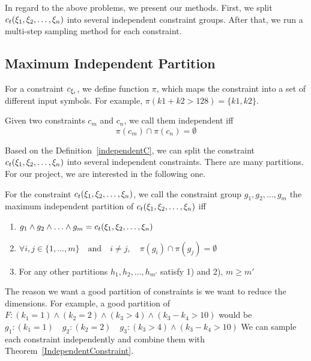 In regard to the above problems, we present our methods. First, we split
$c_t({\xi}_{1},{\xi}_{2},\ldots,{\xi}_{n})$ into several independent constraint
groups. After that, we run a multi-step sampling method for each constraint.

\subsection{Maximum Independent Partition}

For a constraint $c_{{\xi}_{i}}$, we define function $\pi$, which maps the
constraint into a set of different input symbols. For example, $\pi(k1 + k2 >
    128) = \{k1, k2\}$.

\begin{mydef}[]
    \label{independentC}
    Given two constraints $c_m$ and $c_n$, we call them independent iff
    $$\pi(c_m) \cap \pi(c_n) = \emptyset$$
\end{mydef}

Based on the Definition~\ref{independentC}, we can split the constraint
$c_t({\xi}_{1},{\xi}_{2},\ldots,{\xi}_{n})$ into several independent constraints.
There are many partitions. For our project, we are interested in the following
one.

\begin{mydef}\label{Goodpartition}
    For the constraint $c_t({\xi}_{1},{\xi}_{2},\ldots,{\xi}_{n})$,
    we call the constraint group
    $g_{1}, g_{2}, \ldots, g_{m}$
    the maximum independent partition of $c_t({\xi}_{1},{\xi}_{2},\ldots,{\xi}_{n})$ iff
    \begin{enumerate}
        \item $g_{1} \land g_{2} \land \ldots \land g_{m} = c_t({\xi}_{1},{\xi}_{2},\ldots,{\xi}_{n})$
        \item $\forall i, j \in \{1, \ldots, m\} \quad \textrm{and} \quad
                  i \neq j,\quad\pi(g_{i}) \cap \pi(g_{j}) = \emptyset $
        \item For any other partitions  $h_{1}, h_{2}, \ldots, h_{m'}$ satisfy 1) and
              2), $m \geq m'$
    \end{enumerate}

\end{mydef}

The reason we want a good partition of constraints is we want to reduce
the dimensions. For example,
a good partition of $F: ({k_1} = 1)\land({k_2} = 2)\land({k_3} > 4)\land({k_3} - {k_4} > 10)$ would be
$g_{1}: ({k_1} = 1)\quad g_{2}: ({k_2} = 2)\quad g_{3}: ({k_3} > 4) \land
    ({k_3} - {k_4} > 10)$
We can sample each constraint independently and combine them
with Theorem~\ref{IndependentConstraint}.

